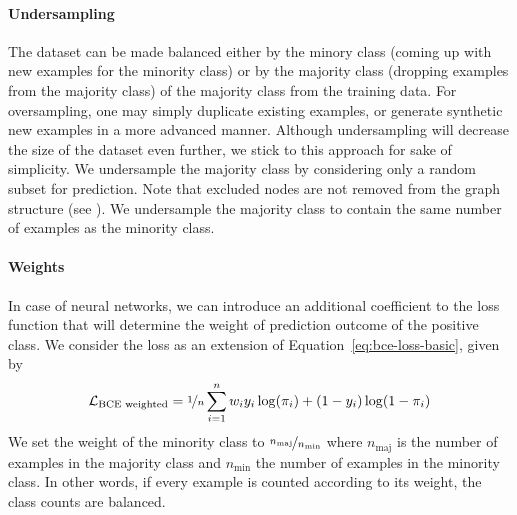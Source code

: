 \documentclass[
	fontsize=10pt, %
	twoside=false, %
	secnumdepth=1, %
  toc=indentunnumbered %
]{kaobook}
\begin{document}
\paragraph{Undersampling}
The dataset can be made balanced 
either by  the minory class (coming up with new examples for
the minority class) or by  the majority class (dropping
examples from the majority class) of the majority class from the training data.
For oversampling, one may simply duplicate existing examples, or generate
synthetic new examples in a more advanced manner. Although undersampling will
decrease the size of the dataset even further, we stick to this approach for
sake of simplicity.
%
We undersample the majority class by considering only a random subset for
prediction. Note that excluded nodes are not removed from the graph structure (see
). We undersample the majority class to contain
the same number of examples as the minority class.




\paragraph{Weights} In case of neural networks, we can introduce an additional
coefficient to the loss function that will determine the weight of prediction
outcome of the positive class.
%
We consider the  loss as
an extension of Equation~\ref{eq:bce-loss-basic}, given by
\begin{align}
  \label{eq:bce-loss-weighted}
  \mathcal{L}_{\text{BCE weighted}} = \nicefrac{1}{n} \sum_{i=1}^n w_i y_i \log(\pi_i) + (1-y_i) \log (1-\pi_i)
\end{align}
We set the weight of the minority class to
$\nicefrac{n_{\text{maj}}}{n_{\text{min}}}$ where $n_{\text{maj}}$ is the number
of examples in the majority
class and $n_{\text{min}}$ the number of examples in the minority class. In
other words, if every example is counted according to its weight, the class
counts are balanced.
\end{document}
